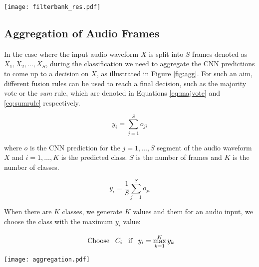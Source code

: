 \documentclass[preprint,final,12pt]{elsarticle}
\begin{document}
\begin{figure*}[htpb!]
  \centering
  \texttt{[image: filterbank\_res.pdf]}
  \caption{Frequency response of 64 filters of Gammatone filterbank.}
  \label{fig:filterbank_gamm_res}
\end{figure*}



\subsection{Aggregation of Audio Frames}
\label{sub:agg}
In the case where the input audio waveform $X$ is split into $S$ frames denoted as $X_1, X_2, \dots, X_S$, during the classification we need to aggregate the CNN predictions to come up to a decision on $X$, as illustrated in Figure \ref{fig:agg}. For such an aim, different fusion rules can be used to reach a final decision, such as the majority vote or the \textit{sum} rule, which are denoted in Equations \ref{eq:majvote} and \ref{eq:sumrule} respectively.

\begin{equation}
    y_i =\sum_{j=1}^S o_{ji}
    \label{eq:majvote}
\end{equation}

\noindent where $o$ is the CNN prediction for the $j=1,\dots,S$ segment of the audio waveform $X$ and $i=1,\dots,K$ is the predicted class. $S$ is the number of frames and $K$ is the number of classes.

\begin{equation}
    y_i = \frac{1}{S}\sum_{j=1}^S o_{ji}
    \label{eq:sumrule}
\end{equation}

When there are $K$ classes, we generate $K$ values and them for an audio input, we choose the class with the maximum $y_i$ value: 

\begin{equation}
    \text{ Choose \enspace}  C_i  \enspace \text{ if \enspace } y_i = \max_{k=1}^{K} y_k 
    \label{eq:decision}
\end{equation}

\begin{figure*}[htpb!]
  \centering
  \texttt{[image: aggregation.pdf]}
  \caption{Aggregation of the predictions on the audio frames.}
  \label{fig:agg}
\end{figure*}
\end{document}
